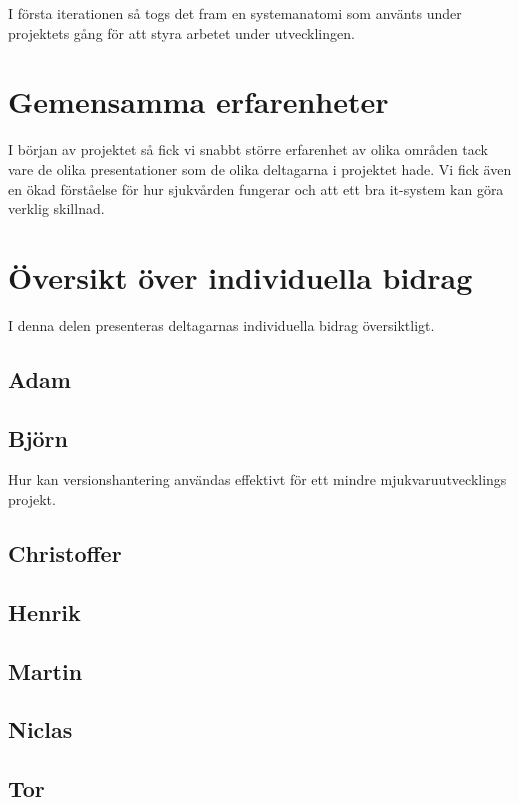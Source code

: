 I första iterationen så togs det fram en systemanatomi som använts under
projektets gång för att styra arbetet under utvecklingen.


\section{Gemensamma erfarenheter}
I början av projektet så fick vi snabbt större erfarenhet av olika områden
tack vare de olika presentationer som de olika deltagarna i projektet hade.
Vi fick även en ökad förståelse för hur sjukvården fungerar och att ett bra
it-system kan göra verklig skillnad.

\section{Översikt över individuella bidrag}
I denna delen presenteras deltagarnas individuella bidrag översiktligt.

\subsection{Adam}
\subsection{Björn}
Hur kan versionshantering användas effektivt för ett mindre mjukvaruutvecklings projekt.
\subsection{Christoffer}
\subsection{Henrik}
\subsection{Martin}
\subsection{Niclas}
\subsection{Tor}
